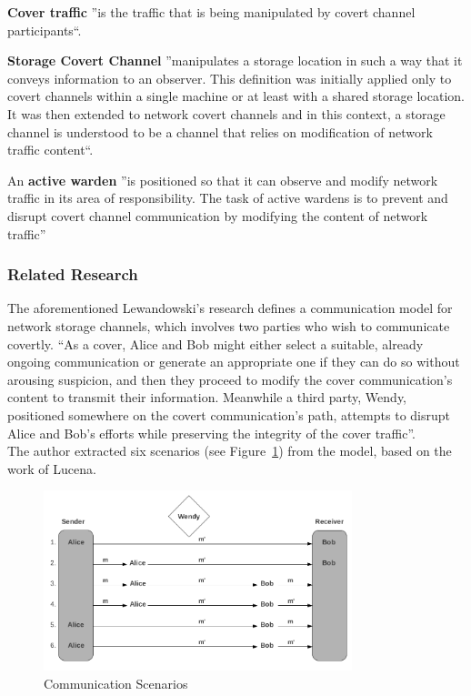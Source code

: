 \documentclass[12pt]{article}
\begin{document}
\textbf{Cover traffic} ''is the traffic that is being manipulated by covert channel participants``\cite{netaware}.

\textbf{Storage Covert Channel} ''manipulates a storage location in such a way that it conveys information to an observer. This definition was initially applied only to covert channels within a single machine or at least 
with a shared storage location. It was then extended to network covert channels and in this context, a storage channel is understood to be a channel that relies on modification of network traffic content``\cite{netaware}.

An \textbf{active warden} ''is positioned so that it can observe and modify network traffic in its area of responsibility. The task of active wardens is to prevent and disrupt covert channel communication by modifying the 
content of network traffic''\cite{netaware}\\

\subsubsection{Related Research}

The aforementioned Lewandowski's research defines a communication model for network storage channels, which involves two parties who wish to communicate covertly. ``As a cover, Alice and Bob might either select a suitable, 
already ongoing communication or generate an appropriate one if they can do so without arousing suspicion, and then they proceed to modify the cover communication’s content to transmit their information. Meanwhile a 
third party, Wendy, positioned somewhere on the covert communication’s path, attempts to disrupt Alice and Bob’s efforts while preserving the integrity of the cover traffic''.\\
The author extracted six scenarios (see Figure~\ref{fig:commScenarios}) from the model, based on the work of Lucena\cite{lucena}.

\begin{figure} [ht] %
\begin{center}
\includegraphics[width=0.8\textwidth]{communicationScenarios}
\caption{Communication Scenarios}
\label{fig:commScenarios}
\end{center}
\end{figure}
\end{document}
